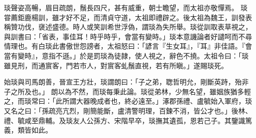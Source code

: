 \begin{pinyinscope}
琰聲姿高暢，眉目疏朗，鬚長四尺，甚有威重，朝士瞻望，而太祖亦敬憚焉。
琰甞薦鉅鹿楊訓，雖才好不足，而清貞守道，太祖即禮辟之。後太祖為魏王，訓發表稱贊功伐，襃述盛德。時人或笑訓希世浮偽，謂琰為失所舉。琰從訓取表草視之，與訓書曰：「省表，事佳耳！時乎時乎，會當有變時。」琰本意譏論者好譴呵而不尋情理也。有白琰此書傲世怨謗者，太祖怒曰：「諺言『生女耳』，『耳』非佳語。『會當有變時』，意指不遜。」於是罰琰為徒隷，使人視之，辭色不撓。太祖令曰：「琰雖見刑，而通賔客，門若市人，對賔客虬鬚直視，若有所瞋。」遂賜琰死。


始琰與司馬朗善，晉宣王方壯，琰謂朗曰：「子之弟，聦哲明允，剛斷英跱，殆非子之所及也。」
朗以為不然，而琰每秉此論。琰從弟林，少無名望，雖姻族猶多輕之，而琰常曰：「此所謂大器晚成者也，終必遠至。」涿郡孫禮、盧毓始入軍府，琰又名之曰：「孫疏亮亢烈，剛簡能斷，盧清警明理，百鍊不消，皆公才也。」後林、禮、毓咸至鼎輔。及琰友人公孫方、宋階早卒，琰撫其遺孤，恩若己子。其鑒識篤義，類皆如此。



\end{pinyinscope}
